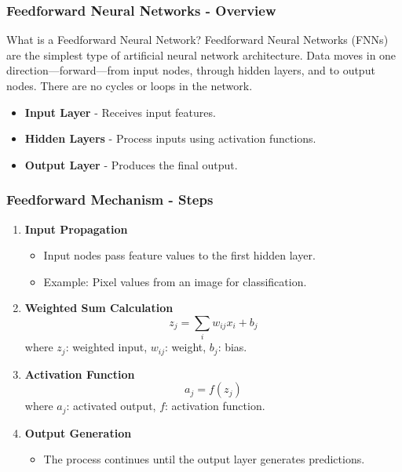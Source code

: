 \documentclass{beamer}
\begin{document}
\begin{frame}[fragile]
    \frametitle{Feedforward Neural Networks - Overview}
    \begin{block}{What is a Feedforward Neural Network?}
        Feedforward Neural Networks (FNNs) are the simplest type of artificial neural network architecture.
        Data moves in one direction—forward—from input nodes, through hidden layers, and to output nodes. 
        There are no cycles or loops in the network.
    \end{block}

    \begin{itemize}
        \item \textbf{Input Layer} - Receives input features.
        \item \textbf{Hidden Layers} - Process inputs using activation functions.
        \item \textbf{Output Layer} - Produces the final output.
    \end{itemize}
\end{frame}

\begin{frame}[fragile]
    \frametitle{Feedforward Mechanism - Steps}
    \begin{enumerate}
        \item \textbf{Input Propagation}
            \begin{itemize}
                \item Input nodes pass feature values to the first hidden layer.
                \item Example: Pixel values from an image for classification.
            \end{itemize}
        
        \item \textbf{Weighted Sum Calculation}
            \begin{equation}
                z_j = \sum_{i} w_{ij} x_i + b_j
            \end{equation}
            where \( z_j \): weighted input, \( w_{ij} \): weight, \( b_j \): bias.
        
        \item \textbf{Activation Function}
            \begin{equation}
                a_j = f(z_j)
            \end{equation}
            where \( a_j \): activated output, \( f \): activation function.
        
        \item \textbf{Output Generation}
            \begin{itemize}
                \item The process continues until the output layer generates predictions.
            \end{itemize}
    \end{enumerate}
\end{frame}
\end{document}

